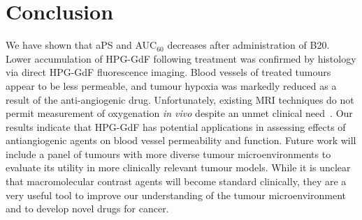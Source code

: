 \section{Conclusion}

We have shown that \acs{aPS} and \acs{AUC}$_{60}$ decreases after administration of B20.
Lower accumulation of \acs{HPG-GdF} following treatment was confirmed by histology via direct \acs{HPG-GdF} fluorescence imaging.
Blood vessels of treated tumours appear to be less permeable, and tumour hypoxia was markedly reduced as a result of the anti-angiogenic drug.
Unfortunately, existing MRI techniques do not permit measurement of oxygenation \emph{in vivo} despite an unmet clinical need~\cite{Horsman:2012kw}.
Our results indicate that \acs{HPG-GdF} has potential applications in assessing effects of antiangiogenic agents on blood vessel permeability and function.
Future work will include a panel of tumours with more diverse tumour microenvironments to evaluate its utility in more clinically relevant tumour models.
While it is unclear that macromolecular contrast agents will become standard clinically, they are a very useful tool to improve our understanding of the tumour microenvironment and to develop novel drugs for cancer.
\endinput